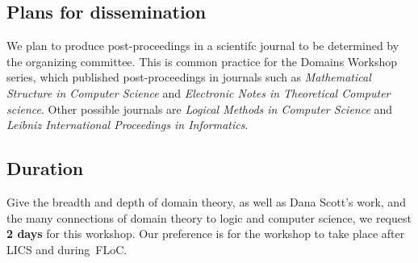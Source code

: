 \documentclass{article}
\begin{document}

\subsection{Plans for dissemination}

We plan to produce post-proceedings in a scientifc journal to be determined by the
organizing committee. This is common practice for the Domains Workshop series, which published post-proceedings in journals such as \emph{Mathematical Structure in Computer Science} and \emph{Electronic Notes in Theoretical Computer science}. Other possible journals are \emph{Logical Methods in Computer Science} and \emph{Leibniz International Proceedings in Informatics}.

\subsection{Duration}

Give the breadth and depth of domain theory, as well as Dana Scott's work, and the many
connections of domain theory to logic and computer science, we request \textbf{2 days} for
this workshop. Our preference is for the workshop to take place after LICS and during~FLoC.
\end{document}
